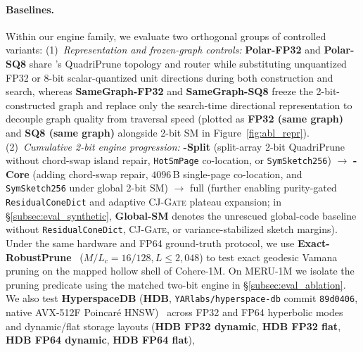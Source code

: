 \paragraph{Baselines.}
Within our engine family, we evaluate two orthogonal groups of controlled variants:
(1)~\emph{Representation and frozen-graph controls:} \textbf{Polar-FP32} and \textbf{Polar-SQ8} share \rquiver{}'s {QuadriPrune} topology and router while substituting unquantized FP32 or 8-bit scalar-quantized unit directions during both construction and search, whereas \textbf{SameGraph-FP32} and \textbf{SameGraph-SQ8} freeze the 2-bit-constructed graph and replace only the search-time directional representation to decouple graph quality from traversal speed (plotted as \textbf{FP32 (same graph)} and \textbf{SQ8 (same graph)} alongside 2-bit {SM} in Figure~\ref{fig:abl_repr}).
(2)~\emph{Cumulative 2-bit engine progression:} \textbf{\rquiver{}-Split} (split-array 2-bit {QuadriPrune} without chord-swap island repair, \texttt{HotSmPage} co-location, or \texttt{SymSketch256}) $\to$ \textbf{\rquiver{}-Core} (adding chord-swap repair, $4096$\,B single-page co-location, and \texttt{SymSketch256} under global 2-bit {SM}) $\to$ full \textbf{\rquiver{}} (further enabling purity-gated \texttt{ResidualConeDict} and adaptive \textsc{CJ-Gate} plateau expansion; in \S\ref{subsec:eval_synthetic}, \textbf{Global-SM} denotes the unrescued global-code baseline without \texttt{ResidualConeDict}, \textsc{CJ-Gate}, or variance-stabilized sketch margins).
Under the same hardware and FP64 ground-truth protocol, we use \textbf{Exact-RobustPrune}~\cite{subramanya2019diskann,prokhorenkova2022hyperbolic} ($M/L_c = 16/128, L \le 2{,}048$) to test exact geodesic {Vamana} pruning on the mapped hollow shell of {Cohere-1M}. On {MERU-1M} we isolate the pruning predicate using the matched two-bit engine in \S\ref{subsec:eval_ablation}. We also test
\textbf{HyperspaceDB} (\textbf{HDB}, \texttt{YARlabs/hyperspace-db} commit \texttt{89d0406}, native {AVX-512F} {Poincar\'e} {HNSW})~\cite{glukhota2026hyperspacedb} across FP32 and FP64 hyperbolic modes and dynamic/flat storage layouts (\textbf{HDB FP32 dynamic}, \textbf{HDB FP32 flat}, \textbf{HDB FP64 dynamic}, \textbf{HDB FP64 flat}),
